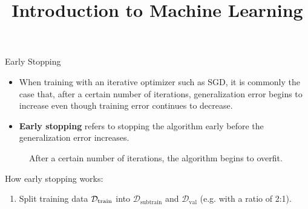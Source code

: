 



\newcommand{\titlefigure}{figure_man/earlystop.png}
\newcommand{\learninggoals}{
  \item Know how early stopping works 
  \item Understand how early stopping acts as a regularizer
}

\title{Introduction to Machine Learning}
\date{}






\begin{vbframe}{Early Stopping}
  
  \begin{itemize}
    \item When training with an iterative optimizer such as SGD, it is commonly the case that, after a certain number of iterations, generalization error begins to increase even though training error continues to decrease.     
    \item \textbf{Early stopping} refers to stopping the algorithm early before the generalization error increases.
  \end{itemize}
  \begin{figure}
    \centering
      \caption{After a certain number of iterations, the algorithm begins to overfit.}
  \end{figure}
\framebreak
  How early stopping works:
  \begin{enumerate}
    \item Split training data $\mathcal{D}_{\text{train}}$ into $\mathcal{D}_{\text{subtrain}}$ and $\mathcal{D}_{\text{val}}$ (e.g. with a ratio of 2:1).

\end{enumerate}
\end{vbframe}
